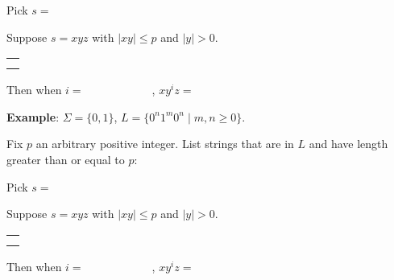 Pick $s = $


Suppose $s = xyz$ with  $|xy|  \leq  p$ and $|y| > 0$.
\begin{center}
\begin{tabular}{|c|}
\hline
 \\
\hspace{4in} \\
\hline
\end{tabular}
\end{center}
Then when $i = \hspace{1in}$, $xy^i z  = \hspace{1in}$



\vspace{30pt} 

{\bf Example}: $\Sigma  =  \{0,1\}$, $L = \{0^n1^m0^n  \mid m,n  \geq 0\}$.

Fix $p$ an arbitrary positive integer. List strings that are in $L$ and have length  greater than or equal  to $p$:

\vspace{10pt}

Pick $s = $


Suppose $s = xyz$ with  $|xy|  \leq  p$ and $|y| > 0$.
\begin{center}
\begin{tabular}{|c|}
\hline
 \\
\hspace{4in} \\
\hline
\end{tabular}
\end{center}
Then when $i = \hspace{1in}$, $xy^i z  = \hspace{1in}$

